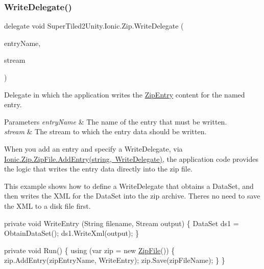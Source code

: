 \subsubsection{\texorpdfstring{Write\+Delegate()}{WriteDelegate()}}
{\footnotesize\ttfamily delegate void Super\+Tiled2\+Unity.\+Ionic.\+Zip.\+Write\+Delegate (\begin{DoxyParamCaption}\item[{string}]{entry\+Name,  }\item[{System.\+I\+O.\+Stream}]{stream }\end{DoxyParamCaption})}



Delegate in which the application writes the {\ttfamily \mbox{\hyperlink{class_super_tiled2_unity_1_1_ionic_1_1_zip_1_1_zip_entry}{Zip\+Entry}}} content for the named entry. 


\begin{DoxyParams}{Parameters}
{\em entry\+Name} & The name of the entry that must be written.\\
\hline
{\em stream} & The stream to which the entry data should be written.\\
\hline
\end{DoxyParams}


When you add an entry and specify a {\ttfamily Write\+Delegate}, via \mbox{\hyperlink{class_super_tiled2_unity_1_1_ionic_1_1_zip_1_1_zip_file_a4db76147d4354e087063303abc6a4ec4}{Ionic.\+Zip.\+Zip\+File.\+Add\+Entry(string, Write\+Delegate)}}, the application code provides the logic that writes the entry data directly into the zip file. 

This example shows how to define a Write\+Delegate that obtains a Data\+Set, and then writes the X\+ML for the Data\+Set into the zip archive. There\textquotesingle{}s no need to save the X\+ML to a disk file first.


\begin{DoxyCode}
\textcolor{keyword}{private} \textcolor{keywordtype}{void} WriteEntry (String filename, Stream output)
\{
    DataSet ds1 = ObtainDataSet();
    ds1.WriteXml(output);
\}

\textcolor{keyword}{private} \textcolor{keywordtype}{void} Run()
\{
    \textcolor{keyword}{using} (var zip = \textcolor{keyword}{new} \mbox{\hyperlink{namespace_super_tiled2_unity_1_1_ionic_1_1_zip_a9ced5352c56e7e0fceff15b534073c83a088ad16b06174c69965e232063ba6d16}{ZipFile}}())
    \{
        zip.AddEntry(zipEntryName, WriteEntry);
        zip.Save(zipFileName);
    \}
\}
\end{DoxyCode}



